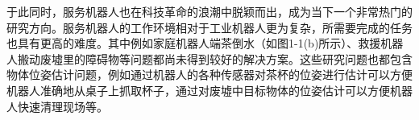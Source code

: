于此同时，服务机器人也在科技革命的浪潮中脱颖而出，成为当下一个非常热门的研究方向。服务机器人的工作环境相对于工业机器人更为复杂，所需要完成的任务也具有更高的难度。其中例如家庭机器人端茶倒水（如图1-1(b)所示）、救援机器人搬动废墟里的障碍物等问题都尚未得到较好的解决方案。这些研究问题也都包含物体位姿估计问题，例如通过机器人的各种传感器对茶杯的位姿进行估计可以方便机器人准确地从桌子上抓取杯子，通过对废墟中目标物体的位姿估计可以方便机器人快速清理现场等。

\begin{figure}[htb]
\end{figure}
